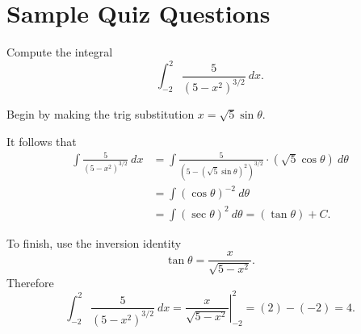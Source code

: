 \documentclass{ximera}
\begin{document}
\section*{Sample Quiz Questions}
\begin{question}%

Compute the integral 
\[\int_{-2}^{2}\frac{5}{(5-x^2)^{3/2}}~dx.\]
\begin{multiplechoice}
\end{multiplechoice}
\begin{feedback}
Begin by making the trig substitution \(x=\sqrt{5}\sin \theta\). \begin{hint} It follows that 
\[ \begin{aligned} \int\frac{5}{(5-x^2)^{3/2}}~dx & = \int \frac{5}{(5-(\sqrt{5}\sin \theta)^2)^{3/2}} \cdot (\sqrt{5}\cos \theta)~d \theta \\
 & = \int (\cos \theta)^{-2}~d \theta \\ & = \int (\sec \theta)^{2} ~ d \theta = (\tan \theta) + C. \end{aligned} \] \begin{hint}
To finish, use the inversion identity \[\tan \theta = \frac{x}{\sqrt{5-x^2}}.\]
Therefore \[\int_{-2}^{2}\frac{5}{(5-x^2)^{3/2}}~dx = \left.\frac{x}{\sqrt{5-x^2}}\right|_{-2}^{2} = \left(2\right) - \left(-2\right) = 4.\] \end{hint} \end{hint}
\end{feedback}

\end{question}
\end{document}

